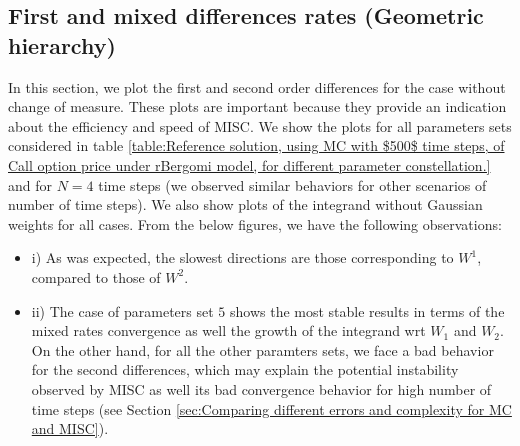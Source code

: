 \documentclass[11pt]{article}
\begin{document}
%
%
%



\subsection{First and mixed differences rates (Geometric hierarchy)}\label{sec:First and mixed differences rates}


In this section, we plot the first and second order differences for the case without change of measure. These plots are important because they provide an indication about the efficiency and speed of MISC. We show the plots for all parameters sets considered in table \ref{table:Reference solution, using MC with $500$ time steps, of Call option price under rBergomi model, for different parameter constellation.}  and for  $N=4$ time steps (we observed similar behaviors for other scenarios of number of time steps). We also show plots of the integrand without Gaussian weights for all cases.  From the below figures, we have the following observations:
\begin{itemize}
	\item i) As was expected, the slowest directions are those corresponding to $W^1$, compared to those of   $W^2$.
	
	\item ii) The case of parameters set $5$ shows the most stable results in terms of the mixed rates convergence as well the growth of the integrand wrt $W_1$ and $W_2$. On the other hand, for all the other paramters sets, we face a bad behavior for the second differences,  which may explain the potential instability observed by MISC as well its bad convergence behavior for high number of time steps (see Section \ref{sec:Comparing different  errors and complexity for MC and MISC}). 
\end{itemize}
\end{document}
